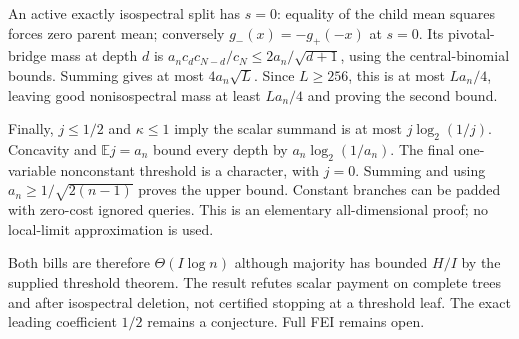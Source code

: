 \documentclass{article}
\begin{document}
An active exactly isospectral split has $s=0$: equality of the child mean squares forces zero parent mean; conversely $g_-(x)=-g_+(-x)$ at $s=0$. Its pivotal-bridge mass at depth $d$ is $a_n c_dc_{N-d}/c_N\le2a_n/\sqrt{d+1}$, using the central-binomial bounds. Summing gives at most $4a_n\sqrt L$. Since $L\ge256$, this is at most $La_n/4$, leaving good nonisospectral mass at least $La_n/4$ and proving the second bound.

Finally, $j\le1/2$ and $\kappa\le1$ imply the scalar summand is at most $j\log_2(1/j)$. Concavity and $\mathbb Ej=a_n$ bound every depth by $a_n\log_2(1/a_n)$. The final one-variable nonconstant threshold is a character, with $j=0$. Summing and using $a_n\ge1/\sqrt{2(n-1)}$ proves the upper bound. Constant branches can be padded with zero-cost ignored queries. This is an elementary all-dimensional proof; no local-limit approximation is used.

Both bills are therefore $\Theta(I\log n)$ although majority has bounded $H/I$ by the supplied threshold theorem. The result refutes scalar payment on complete trees and after isospectral deletion, not certified stopping at a threshold leaf. The exact leading coefficient $1/2$ remains a conjecture. Full FEI remains open.
\end{document}
